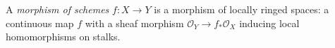 
A \emph{morphism of schemes} $f:X\to Y$ is a morphism of locally ringed spaces: a continuous map $f$ with a sheaf morphism $\mathcal O_Y\to f_*\mathcal O_X$ inducing local homomorphisms on stalks.
